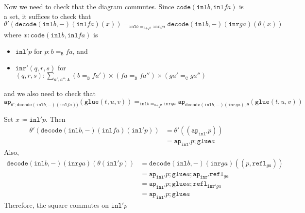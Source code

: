 \message{ !name(notes.tex)}\documentclass[12pt]{amsart}
\newcommand{\type}[1]{\mathtt{#1}}
\newcommand{\tin}{\colon}
\newcommand{\A}{\type{A}}
\newcommand{\B}{\type{B}}
\newcommand{\C}{\type{C}}
\newcommand{\BAC}{\B +_{\A} \C}
\newcommand{\ap}{\type{ap}}
\newcommand{\inl}{\type{inl}}
\newcommand{\inr}{\type{inr}}
\newcommand{\glue}{\type{glue}}
\newcommand{\refl}{\type{refl}}
\newcommand{\code}{\type{code}}
\newcommand{\decode}{\type{decode}}
\theoremstyle{remark}
\theoremstyle{definition}
\begin{document}
Now we need to check that the diagram commutes.  Since \( \code ( \inl
b , \inl fa ) \) is a set, it suffices to check that
\[
  \theta' ( \decode (\inl b,-) ( \inl fa ) ( x ) )
  =_{ \inl b =_{\BAC} \inr ga }
  \decode ( \inl b,-)(\inr ga) ( \theta ( x ) )
\]
where \( x \tin \code ( \inl b, \inl fa ) \) is
\begin{itemize}
\item
  \( \inl' p \) for \( p \tin b=_\B fa \), and
\item
  \( \inr' ( q,r,s ) \) for
  \( ( q,r,s ) \tin \sum\limits_{a',a'' \tin \A} (b=_\B fa') \times (
  fa =_\B fa'' )\times ( ga'=_\C ga'' ) \)
\end{itemize}
and we also need to check that
\[
  \ap_{\theta' ; \decode (\inl b,-) ( \inl fa ) )} ( \glue ( t,u,v ) ) 
  =_{ \inl b =_{\BAC} \inr ga }
  \ap_{ \decode ( \inl b,-)(\inr ga) ; \theta } ( \glue ( t,u,v ) ) 
\]

Set \( x \coloneqq \inl' p \).  Then
\begin{align*}
  \theta' ( \decode (\inl b,-) ( \inl fa ) ( \inl' p ) )
  & = \theta' ( ( \ap_{\inl'} p ) ) \\
  & = \ap_{\inl'} p ; \glue a
\end{align*}
Also,
\begin{align*}
  \decode ( \inl b , - ) ( \inr ga ) ( \theta ( \inl' p ) )
  & = \decode ( \inl b , - ) ( \inr ga ) ( ( p,\refl_{ga} ) ) \\
  & = \ap_{\inl'} p ; \glue a ; \ap_{\inr'} \refl_{ga} \\
  & = \ap_{\inl'} p ; \glue a ; \refl_{\inr' ga} \\
  & = \ap_{\inl'} p ; \glue a
\end{align*}
Therefore, the square commutes on \( \inl' p \)
\end{document}

